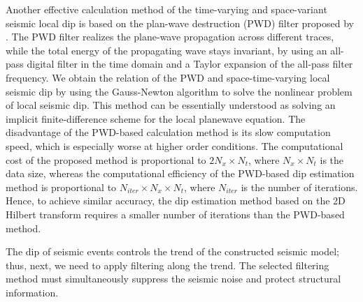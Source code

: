 Another effective calculation method of the time-varying and
space-variant seismic local dip is based on the plan-wave destruction
(PWD) filter proposed by \cite{Fomel02}. The PWD filter realizes the
plane-wave propagation across different traces, while the total energy
of the propagating wave stays invariant, by using an all-pass digital
filter in the time domain and a Taylor expansion of the all-pass
filter frequency. We obtain the relation of the PWD and
space-time-varying local seismic dip by using the Gauss-Newton
algorithm to solve the nonlinear problem of local seismic dip.  This
method can be essentially understood as solving an implicit
finite-difference scheme for the local planewave equation. The
disadvantage of the PWD-based calculation method is its slow
computation speed, which is especially worse at higher order
conditions.  The computational cost of the proposed method is
proportional to $2N_{x}\times N_{t}$, where $N_{x}\times N_{t}$ is the
data size, whereas the computational efficiency of the PWD-based dip
estimation method is proportional to $N_{iter}\times N_{x} \times
N_{t}$, where $N_{iter}$ is the number of iterations. Hence, to
achieve similar accuracy, the dip estimation method based on the 2D
Hilbert transform requires a smaller number of iterations than the
PWD-based method.  

The dip of seismic events controls the trend of the
constructed seismic model; thus, next, we need to apply filtering
along the trend. The selected filtering method must simultaneously
suppress the seismic noise and protect structural information.

